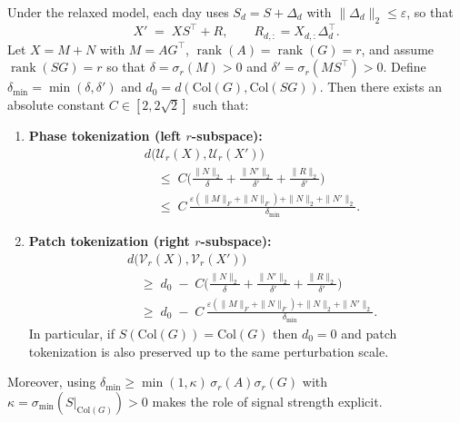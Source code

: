 \begin{theorem}\label{thm:relaxed}
Under the relaxed model, each day uses $S_d=S+\Delta_d$ with $\|\Delta_d\|_2\le\varepsilon$, so that
\[
X' \;=\; X S^\top + R,\qquad R_{d,:}=X_{d,:}\Delta_d^\top .
\]
Let $X=M+N$ with $M=AG^\top$, $\operatorname{rank}(A)=\operatorname{rank}(G)=r$, and assume
$\operatorname{rank}(SG)=r$ so that $\delta=\sigma_r(M)>0$ and $\delta'=\sigma_r(MS^\top)>0$.
Define $\delta_{\min}=\min(\delta,\delta')$ and $d_0=d(\mathrm{Col}(G),\mathrm{Col}(SG))$.
Then there exists an absolute constant $C\in[2,2\sqrt2]$ such that:
\begin{enumerate}[leftmargin=2em]
\item \textbf{Phase tokenization (left $r$-subspace):}
\[
\begin{aligned}
&d\big(\mathcal U_r(X), \mathcal U_r(X')\big)\\
&\quad\le\;
C\Bigg(
   \frac{\|N\|_2}{\delta}
 + \frac{\|N'\|_2}{\delta'}
 + \frac{\|R\|_2}{\delta'}
\Bigg) \\
&\quad\le\;
C\,\frac{\varepsilon(\|M\|_F+\|N\|_F)
   + \|N\|_2
   + \|N'\|_2}{\delta_{\min}}.
\end{aligned}
\]

\item \textbf{Patch tokenization (right $r$-subspace):}
\[
\begin{aligned}
&d\big(\mathcal V_r(X), \mathcal V_r(X')\big)\\
&\quad\ge\;
d_0 \;-\;
C\Bigg(
   \frac{\|N\|_2}{\delta}
 + \frac{\|N'\|_2}{\delta'}
 + \frac{\|R\|_2}{\delta'}
\Bigg) \\
&\quad\ge\;
d_0 \;-\;
C\,\frac{\varepsilon(\|M\|_F+\|N\|_F)
   + \|N\|_2
   + \|N'\|_2}{\delta_{\min}}.
\end{aligned}
\]
In particular, if $S(\mathrm{Col}(G))=\mathrm{Col}(G)$ then $d_0=0$ and patch tokenization is also preserved up to the same perturbation scale.
\end{enumerate}
Moreover, using $\delta_{\min}\ge \min(1,\kappa)\,\sigma_r(A)\sigma_r(G)$ with
$\kappa=\sigma_{\min}(S|_{\mathrm{Col}(G)})>0$ makes the role of signal strength explicit.
\end{theorem}

